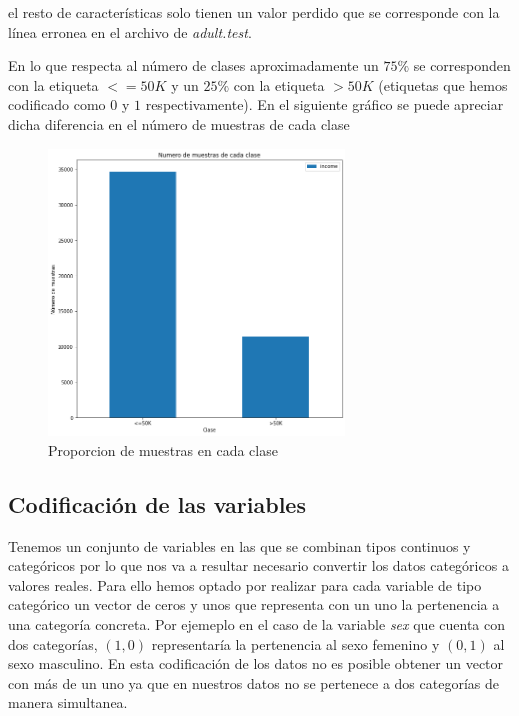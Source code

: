 \documentclass[11pt]{article}
\begin{document}
el resto de características solo tienen un valor perdido que se corresponde 
con la línea erronea en el archivo de \textit{adult.test}.

En lo que respecta al número de clases aproximadamente un $75\%$ se corresponden 
con la etiqueta $<=50K$ y un $25\%$ con la etiqueta $>50K$ (etiquetas que hemos
codificado como $0$ y $1$ respectivamente). En el siguiente gráfico se puede apreciar 
dicha diferencia en el número de muestras de cada clase 

\begin{figure}[h!]
    \centering
    \includegraphics[width=0.7\textwidth]{images/proportion}
    \caption{Proporcion de muestras en cada clase}
\end{figure}


\subsection{Codificación de las variables}

Tenemos un conjunto de variables en las que se combinan tipos continuos y
categóricos por lo que nos va a resultar necesario convertir los datos
categóricos a valores reales. Para ello hemos optado por realizar para cada
variable de tipo categórico un vector de ceros y unos que representa con un uno
la pertenencia a una categoría concreta. Por ejemeplo en el caso de la variable
\textit{sex} que cuenta con dos categorías, $(1,0)$ representaría la pertenencia
al sexo femenino y $(0,1)$ al sexo masculino. En esta codificación de los datos
no es posible obtener un vector con más de un uno ya que en nuestros datos no se
pertenece a dos categorías de manera simultanea.
\end{document}
